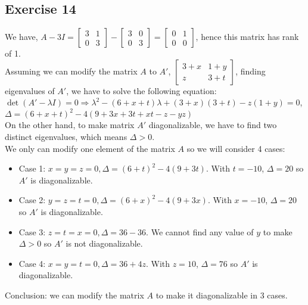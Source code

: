 \documentclass{article}
\begin{document}
\subsection{Exercise 14}
We have,
$A - 3I =
\begin{bmatrix}
    3 & 1 \\
    0 & 3
\end{bmatrix} -
\begin{bmatrix}
    3 & 0 \\
    0 & 3
\end{bmatrix} =
\begin{bmatrix}
    0 & 1 \\
    0 & 0
\end{bmatrix}$, hence this matrix has rank of 1.
\\
Assuming we can modify the matrix $A$ to $A'$,
$\begin{bmatrix}
    3 + x & 1 + y \\
    z & 3 + t
\end{bmatrix}$, finding eigenvalues of $A'$, we have to solve the following equation:
\\
$\det(A' - \lambda I) = 0 \Rightarrow {\lambda}^2 - (6 + x + t)\lambda + (3 + x)(3 + t) -z(1 + y) = 0$,
\\
$\Delta = {(6 + x + t)}^2 - 4(9 + 3x + 3t + xt - z - yz)$
\\
On the other hand, to make matrix $A'$ diagonalizable, we have to find two distinct eigenvalues, which means $\Delta > 0$.
\\
We only can modify one element of the matrix $A$ so we will consider 4 cases:
\begin{itemize}
    \item Case 1: $x = y = z = 0, \Delta = {(6 + t)}^2 - 4(9 + 3t)$. With $t = -10$, $\Delta = 20$ so $A'$ is diagonalizable.
    \item Case 2: $y = z = t = 0, \Delta = {(6 + x)}^2 - 4(9 + 3x)$. With $x = -10$, $\Delta = 20$ so $A'$ is diagonalizable.
    \item Case 3: $z = t = x = 0, \Delta = 36 - 36$. We cannot find any value of $y$ to make $\Delta > 0$ so $A'$ is not diagonalizable.
    \item Case 4: $x = y = t = 0, \Delta = 36 + 4z$. With $z = 10$, $\Delta = 76$ so $A'$ is diagonalizable.
\end{itemize}
Conclusion: we can modify the matrix $A$ to make it diagonalizable in 3 cases.
\end{document}
